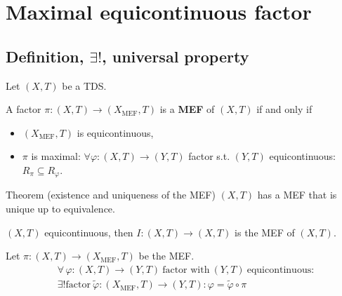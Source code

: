\section{Maximal equicontinuous factor}
\subsection{Definition, $\exists!$, universal property}
\begin{frame}
  Let $(X,T)$ be a TDS.
  \begin{definition}
    A factor $\pi : (X,T) \to (X_{\text{MEF}},T)$ is a \textbf{MEF} of $(X,T)$ if and only if
  \begin{itemize}
    \item $(X_{\text{MEF}},T)$ is equicontinuous,
    \item $\pi$ is maximal: $\forall \varphi : (X,T) \to (Y,T)$ factor s.t. $(Y,T)$ equicontinuous: $R_\pi \subseteq R_\varphi$.
  \end{itemize}
\end{definition}
\pause
  \begin{alertblock}{Theorem (existence and uniqueness of the MEF)}
  $(X,T)$ has a MEF that is unique up to equivalence.
  \end{alertblock}
  \pause
\begin{example}
  $(X,T)$ equicontinuous, then $I: (X,T) \to (X,T)$ is the MEF of $(X,T)$.
\end{example}

\end{frame}
\begin{frame}[fragile]
\begin{proposition}
  Let $\pi : (X, T) \to  (X_{\text{MEF}},T)$ be the MEF.
  \begin{equation*}
    \begin{split}
      &\forall \, \varphi : (X,T) \to (Y,T) \ \text{factor with} \ (Y,T) \ \text{equicontinuous}: \\
      & \exists! \text{factor} \ \tilde{\varphi}: (X_{\text{MEF}},T) \to (Y,T): \varphi = \tilde{\varphi} \circ \pi
    \end{split}
      \end{equation*}
  \end{proposition}
  \begin{center}
  \end{center}
\end{frame}
